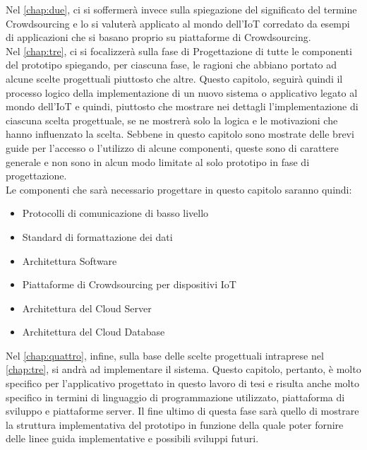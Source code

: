 \documentclass[11pt]{toptesi}
\begin{document}
Nel \autoref{chap:due}, ci si soffermerà invece sulla spiegazione del significato del termine Crowdsourcing e lo si valuterà applicato al mondo dell'IoT corredato da esempi di applicazioni che si basano proprio su piattaforme di Crowdsourcing.\\

Nel \autoref{chap:tre}, ci si focalizzerà sulla fase di Progettazione di tutte le componenti del prototipo spiegando, per ciascuna fase, le ragioni che abbiano portato ad alcune scelte progettuali piuttosto che altre. Questo capitolo, seguirà quindi il processo logico della implementazione di un nuovo sistema o applicativo legato al mondo dell'IoT e quindi, piuttosto che mostrare nei dettagli l'implementazione di ciascuna scelta progettuale, se ne mostrerà solo la logica e le motivazioni che hanno influenzato la scelta. Sebbene in questo capitolo sono mostrate delle brevi guide per l'accesso o l'utilizzo di alcune componenti, queste sono di carattere generale e non sono in alcun modo limitate al solo prototipo in fase di progettazione.\\
Le componenti che sarà necessario progettare in questo capitolo saranno quindi:\\
\begin{itemize}
	\item Protocolli di comunicazione di basso livello
	\item Standard di formattazione dei dati
	\item Architettura Software
	\item Piattaforme di Crowdsourcing per dispositivi IoT
	\item Architettura del Cloud Server
	\item Architettura del Cloud Database
\end{itemize}

Nel \autoref{chap:quattro}, infine, sulla base delle scelte progettuali intraprese nel \autoref{chap:tre}, si andrà ad implementare il sistema. Questo capitolo, pertanto, è molto specifico per l'applicativo progettato in questo lavoro di tesi e risulta anche molto specifico in termini di linguaggio di programmazione utilizzato, piattaforma di sviluppo e piattaforme server. Il fine ultimo di questa fase sarà quello di mostrare la struttura implementativa del prototipo in funzione della quale poter fornire delle linee guida implementative e possibili sviluppi futuri.


\end{document}
